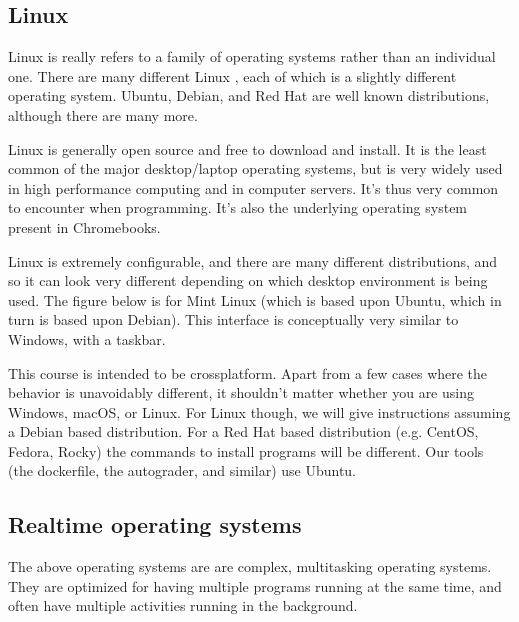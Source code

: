 \documentclass[letterpaper,10pt,british]{sphinxmanual}
\let\sphinxpxdimen\pdfpxdimen\else\newdimen\sphinxpxdimen
\begin{document}
\subsection{Linux}
\label{\detokenize{chapters/computer_software/major_operating_systems:linux}}
\sphinxAtStartPar
Linux is really refers to a family of operating systems rather than an individual one. There are many different Linux , each of which is a slightly different operating system. Ubuntu, Debian, and Red Hat are well known distributions, although there are many more.

\sphinxAtStartPar
Linux is generally open source and free to download and install. It is the least common of the major desktop/laptop operating systems, but is very widely used in high performance computing and in computer servers. It’s thus very common to encounter when programming. It’s also the underlying operating system present in Chromebooks.

\sphinxAtStartPar
Linux is extremely configurable, and there are many different distributions, and so it can look very different depending on which desktop environment is being used. The figure below is for Mint Linux (which is based upon Ubuntu, which in turn is based upon Debian). This interface is conceptually very similar to Windows, with a taskbar.

\begin{figure}[htbp]
\centering

\noindent\sphinxincludegraphics[width=700\sphinxpxdimen]{{linux_desktop}.png}
\end{figure}

\sphinxAtStartPar
This course is intended to be cross\sphinxhyphen{}platform. Apart from a few cases where the behavior is unavoidably different, it shouldn’t matter whether you are using Windows, macOS, or Linux. For Linux though, we will give instructions assuming a Debian based distribution. For a Red Hat based distribution (e.g. CentOS, Fedora, Rocky) the commands to install programs will be different. Our tools (the dockerfile, the autograder, and similar) use Ubuntu.


\subsection{Real\sphinxhyphen{}time operating systems}
\label{\detokenize{chapters/computer_software/major_operating_systems:real-time-operating-systems}}
\sphinxAtStartPar
The above operating systems are are complex, multi\sphinxhyphen{}tasking operating systems. They are optimized for having multiple programs running at the same time, and often have multiple activities running in the background.
\end{document}
